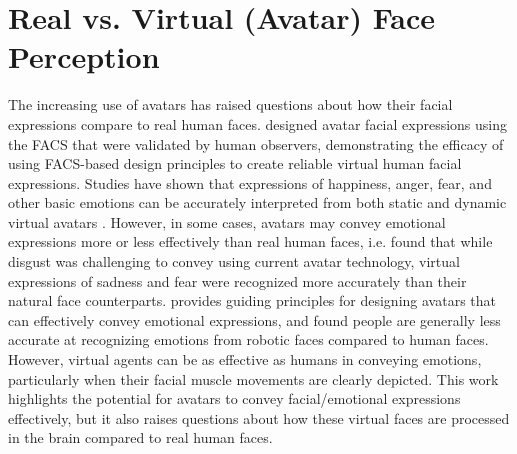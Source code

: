 \section{Real vs. Virtual (Avatar) Face Perception}
The increasing use of avatars has raised questions about how their facial expressions compare to real human faces.
\cite{garcia_design_2020} designed avatar facial expressions using the FACS that were validated by human observers, demonstrating the efficacy of using FACS-based design principles to create reliable virtual human facial expressions.
Studies have shown that expressions of happiness, anger, fear, and other basic emotions can be accurately interpreted from both static and dynamic virtual avatars \citep{de_paolis_perception_2015, dyck_recognition_2008}.
However, in some cases, avatars may convey emotional expressions more or less effectively than real human faces, i.e. \cite{dyck_recognition_2008} found that while disgust was challenging to convey using current avatar technology, virtual expressions of sadness and fear were recognized more accurately than their natural face counterparts.
\cite{hortensius_perception_2018} provides guiding principles for designing avatars that can effectively convey emotional expressions, and found people are generally less accurate at recognizing emotions from robotic faces compared to human faces. 
However, virtual agents can be as effective as humans in conveying emotions, particularly when their facial muscle movements are clearly depicted.
This work highlights the potential for avatars to convey facial/emotional expressions effectively, but it also raises questions about how these virtual faces are processed in the brain compared to real human faces.

